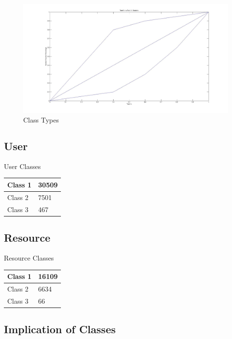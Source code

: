 \documentclass[12pt,a4paper]{report}
\begin{document}
	\vspace{-5cm}
	\begin{figure}
	\hspace{-3.7cm}\includegraphics[width=200mm]{timelineFav.jpg}
	\caption{Class Types}
	\end{figure}

	\clearpage

	\subsection{User}

	\begin{center}
	\textup{\Large User Classes}
	\begin{tabular}{|p{6.5cm}|p{6.5cm}|}
	\hline
	Class 1 &  30509 \\ 
	\hline
	Class 2 & 7501 \\
	\hline
	Class 3 & 467\\
	\hline
	\end{tabular}
	\end{center}

	\subsection{Resource}

	\begin{center}
	\textup{\Large Resource Classes}
	\begin{tabular}{|p{6.5cm}|p{6.5cm}|}
	\hline
	Class 1 &  16109 \\ 
	\hline
	Class 2 & 6634 \\
	\hline
	Class 3 & 66 \\
	\hline
	\end{tabular}
	\end{center}

	\subsection{Implication of Classes}
\end{document}
